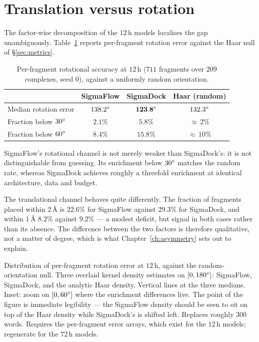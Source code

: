\section{Translation versus rotation}
\label{sec:trans-vs-rot}

The factor-wise decomposition of the $12$\,h models localises the gap
unambiguously. Table~\ref{tab:rotation} reports per-fragment rotation error
against the Haar null of \S\ref{sec:metrics}.

\begin{table}[htbp]
\centering
\caption{Per-fragment rotational accuracy at $12$\,h ($711$ fragments over
$209$ complexes, seed $0$), against a uniformly random orientation.}
\label{tab:rotation}
\small
\begin{tabular}{@{}lccc@{}}
\toprule
 & SigmaFlow & SigmaDock & Haar (random) \\
\midrule
Median rotation error       & $138.2^{\circ}$ & $\mathbf{123.8^{\circ}}$ & $132.3^{\circ}$ \\
Fraction below $30^{\circ}$   & $2.1\%$ & $\mathbf{5.8\%}$ & ${\approx}\,2\%$ \\
Fraction below $60^{\circ}$   & $8.4\%$ & $\mathbf{15.8\%}$ & ${\approx}\,10\%$ \\
\bottomrule
\end{tabular}
\end{table}

SigmaFlow's rotational channel is not merely weaker than SigmaDock's: it is
not distinguishable from guessing. Its enrichment below $30^{\circ}$ matches the
random rate, whereas SigmaDock achieves roughly a threefold enrichment at
identical architecture, data and budget.

The translational channel behaves quite differently. The fraction of fragments
placed within $2$\,\AA{} is $22.6\%$ for SigmaFlow against $29.3\%$ for
SigmaDock, and within $1$\,\AA{} $8.2\%$ against $9.2\%$ --- a modest deficit,
but signal in both cases rather than its absence. The difference between the
two factors is therefore qualitative, not a matter of degree, which is what
Chapter~\ref{ch:asymmetry} sets out to explain.

{Distribution of per-fragment rotation error at $12$\,h, against the
random-orientation null.}
{Three overlaid kernel density estimates on $[0,180^{\circ}]$: SigmaFlow,
SigmaDock, and the analytic Haar density. Vertical lines at the three medians.
Inset: zoom on $[0,60^{\circ}]$ where the enrichment differences live.
The point of the figure is immediate legibility --- the SigmaFlow density
should be seen to sit on top of the Haar density while SigmaDock's is shifted
left. Replaces roughly 300 words. Requires the per-fragment error arrays,
which exist for the $12$\,h models; regenerate for the $72$\,h models.}

